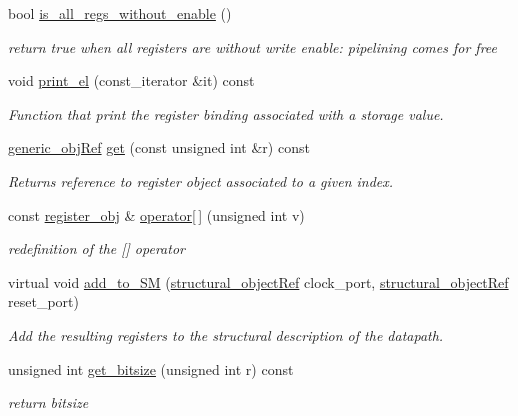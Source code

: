 \begin{DoxyCompactItemize}
bool \hyperlink{classreg__binding_a5a6584d2dea3c38dce0c7db265bfc2d7}{is\+\_\+all\+\_\+regs\+\_\+without\+\_\+enable} ()
\begin{DoxyCompactList}\small\item\em return true when all registers are without write enable\+: pipelining comes for free \end{DoxyCompactList}\item 
void \hyperlink{classreg__binding_abcd4e3cda44712d54c47301cc5fedfb0}{print\+\_\+el} (const\+\_\+iterator \&it) const
\begin{DoxyCompactList}\small\item\em Function that print the register binding associated with a storage value. \end{DoxyCompactList}\item 
\hyperlink{generic__obj_8hpp_acb533b2ef8e0fe72e09a04d20904ca81}{generic\+\_\+obj\+Ref} \hyperlink{classreg__binding_ad041ee9fb9f1951b5f7a14723aa36983}{get} (const unsigned int \&r) const
\begin{DoxyCompactList}\small\item\em Returns reference to register object associated to a given index. \end{DoxyCompactList}\item 
const \hyperlink{classregister__obj}{register\+\_\+obj} \& \hyperlink{classreg__binding_a555a7ceaa089184a3d36a176d135378a}{operator\mbox{[}$\,$\mbox{]}} (unsigned int v)
\begin{DoxyCompactList}\small\item\em redefinition of the \mbox{[}\mbox{]} operator \end{DoxyCompactList}\item 
virtual void \hyperlink{classreg__binding_aaf06706babf5b4d7ed2bc1c9849fd10a}{add\+\_\+to\+\_\+\+SM} (\hyperlink{structural__objects_8hpp_a8ea5f8cc50ab8f4c31e2751074ff60b2}{structural\+\_\+object\+Ref} clock\+\_\+port, \hyperlink{structural__objects_8hpp_a8ea5f8cc50ab8f4c31e2751074ff60b2}{structural\+\_\+object\+Ref} reset\+\_\+port)
\begin{DoxyCompactList}\small\item\em Add the resulting registers to the structural description of the datapath. \end{DoxyCompactList}\item 
unsigned int \hyperlink{classreg__binding_a0cabf46fc41f3e673c810459e728b41c}{get\+\_\+bitsize} (unsigned int r) const
\begin{DoxyCompactList}\small\item\em return bitsize \end{DoxyCompactList}\end{DoxyCompactItemize}
